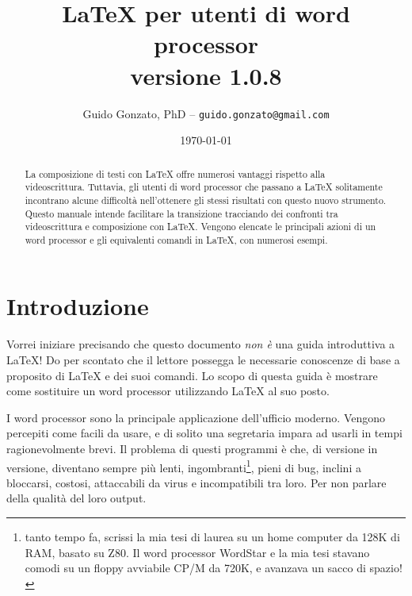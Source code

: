 \documentclass[a4paper,11pt]{article}
\def\version {1.0.8}
\begin{document}
\frenchspacing %
\setlength{\parindent}{0pt}
\setlength{\parskip}{3pt}

\title{\LaTeX{} per utenti di word processor\\versione \version}

\author{Guido Gonzato, PhD --
\texttt{guido.gonzato@gmail.com}}

\date{\today}

\maketitle

\begin{abstract}

  La composizione di testi con \LaTeX{} offre numerosi vantaggi
  rispetto alla videoscrittura. Tuttavia, gli utenti di word processor
  che passano a \LaTeX{} solitamente incontrano alcune difficolt\`a
  nell'ottenere gli stessi risultati con questo nuovo strumento.
  Questo manuale intende facilitare la transizione tracciando dei
  confronti tra videoscrittura e composizione con \LaTeX. Vengono
  elencate le principali azioni di un word processor e gli equivalenti
  comandi in \LaTeX, con numerosi esempi.

\end{abstract}

\begin{footnotesize}
  \tableofcontents
  \listoftables
  \listoffigures
\end{footnotesize}


\pagestyle{fancy}

\section{Introduzione}

Vorrei iniziare precisando che questo documento \emph{non \`e} una
guida introduttiva a \LaTeX! Do per scontato che il lettore possegga
le necessarie conoscenze di base a proposito di \LaTeX{} e dei suoi
comandi. Lo scopo di questa guida \`e mostrare come sostituire un word
processor utilizzando \LaTeX{} al suo posto.

I word processor sono la principale applicazione dell'ufficio moderno.
Vengono percepiti come facili da usare, e di solito una segretaria
impara ad usarli in tempi ragionevolmente brevi. Il problema di questi
programmi \`e che, di versione in versione, diventano sempre pi\`u
lenti, ingombranti\footnote{tanto tempo fa, scrissi la mia tesi di
laurea su un home computer da 128K di RAM, basato su Z80. Il word
processor WordStar e la mia tesi stavano comodi su un floppy avviabile
CP/M da 720K, e avanzava un sacco di spazio!}, pieni di bug, inclini a
bloccarsi, costosi, attaccabili da virus e incompatibili tra loro. Per
non parlare della qualit\`a del loro output.
\end{document}
